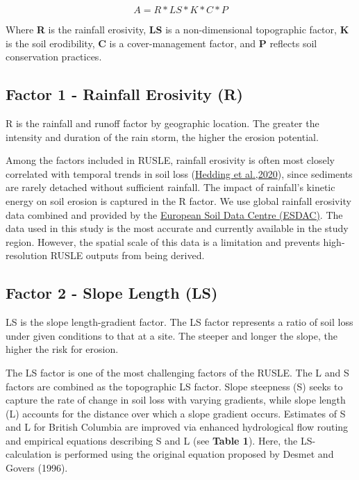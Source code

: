 \documentclass[
]{article}
\begin{document}
\begin{equation}
A = R * LS * K * C * P
\end{equation}

Where \textbf{R} is the rainfall erosivity, \textbf{LS} is a non-dimensional topographic factor, \textbf{K} is the soil erodibility, \textbf{C} is a cover-management factor, and \textbf{P} reflects soil conservation practices.

\hypertarget{sec-factor-1}{%
\subsection*{Factor 1 - Rainfall Erosivity (R)}\label{sec-factor-1}}

R is the rainfall and runoff factor by geographic location. The greater the intensity and duration of the rain storm, the higher the erosion potential.

Among the factors included in RUSLE, rainfall erosivity is often most closely correlated with temporal trends in soil loss (\href{https://www.researchgate.net/publication/336586973_A_comprehensive_study_of_erosivity_and_soil_erosion_over_a_small_tropical_islet_Round_Island_Mauritius}{Hedding et al.,2020}), since sediments are rarely detached without sufficient rainfall. The impact of rainfall's kinetic energy on soil erosion is captured in the R factor. We use global rainfall erosivity data combined and provided by the \href{https://esdac.jrc.ec.europa.eu/content/global-rainfall-erosivity\#tabs-0-description=1}{European Soil Data Centre (ESDAC)}. The data used in this study is the most accurate and currently available in the study region. However, the spatial scale of this data is a limitation and prevents high-resolution RUSLE outputs from being derived.

\hypertarget{sec-factor-2}{%
\subsection*{Factor 2 - Slope Length (LS)}\label{sec-factor-2}}

LS is the slope length-gradient factor. The LS factor represents a ratio of soil loss under given conditions to that at a site. The steeper and longer the slope, the higher the risk for erosion.

The LS factor is one of the most challenging factors of the RUSLE. The L and S factors are combined as the topographic LS factor. Slope steepness (S) seeks to capture the rate of change in soil loss with varying gradients, while slope length (L) accounts for the distance over which a slope gradient occurs. Estimates of S and L for British Columbia are improved via enhanced hydrological flow routing and empirical equations describing S and L (see \textbf{Table 1}). Here, the LS-calculation is performed using the original equation proposed by Desmet and Govers (1996).
\end{document}
